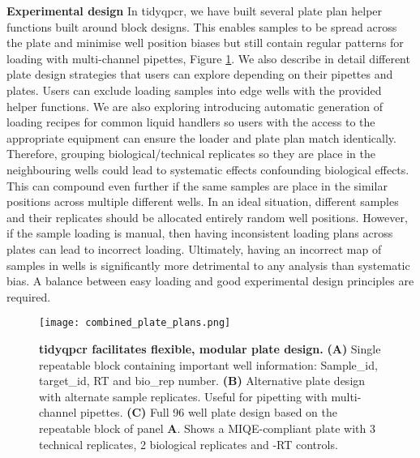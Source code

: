 \documentclass[../main.tex]{subfiles}
\begin{document}
\textbf{Experimental design}  In tidyqpcr, we have built several plate plan helper functions built around block designs.
This enables samples to be spread across the plate and minimise well position biases but still contain regular patterns for loading with multi-channel pipettes, Figure \ref{fig:combined-plate-design}.
We also describe in detail different plate design strategies that users can explore depending on their pipettes and plates.
Users can exclude loading samples into edge wells with the provided helper functions.
We are also exploring introducing automatic generation of loading recipes for common liquid handlers so users with the access to the appropriate equipment can ensure the loader and plate plan match identically.
Therefore, grouping biological/technical replicates so they are place in the neighbouring wells could lead to systematic effects confounding biological effects.
This can compound even further if the same samples are place in the similar positions across multiple different wells. In an ideal situation, different samples and their replicates should be allocated entirely random well positions.
However, if the sample loading is manual, then having inconsistent loading plans across plates can lead to incorrect loading.
Ultimately, having an incorrect map of samples in wells is significantly more detrimental to any analysis than systematic bias.
A balance between easy loading and good experimental design principles are required.

\begin{figure}[p]

{\centering \texttt{[image: combined\_plate\_plans.png]} 

}

\caption[tidyqpcr facilitates flexible, modular plate design.]{\textbf{tidyqpcr facilitates flexible, modular plate design.} \textbf{(A)} Single repeatable block containing important well information: Sample\_id, target\_id, RT and bio\_rep number. 
\textbf{(B)} Alternative plate design with alternate sample replicates. Useful for pipetting with multi-channel pipettes. 
\textbf{(C)} Full 96 well plate design based on the repeatable block of panel \textbf{A}. 
Shows a MIQE-compliant plate with 3 technical replicates, 2 biological replicates and -RT controls.} \label{fig:combined-plate-design}
\end{figure}
\end{document}
